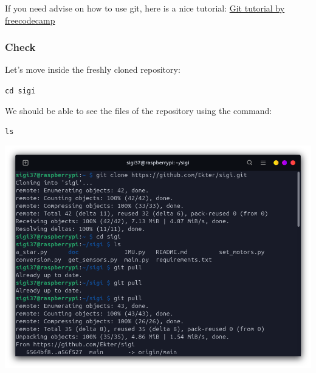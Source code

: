 \documentclass{article}
\begin{document}
If you need advise on how to use git, here is a nice tutorial:
\href{https://www.freecodecamp.org/news/learn-the-basics-of-git-in-under-10-minutes-da548267cc91/
}{Git tutorial by freecodecamp}

\subsubsection{Check}

Let's move inside the freshly cloned repository:

\texttt{cd sigi}

We should be able to see the files of the repository using the command:

\texttt{ls}

\includegraphics[scale=0.37]{img/git_worked.png}
\end{document}
